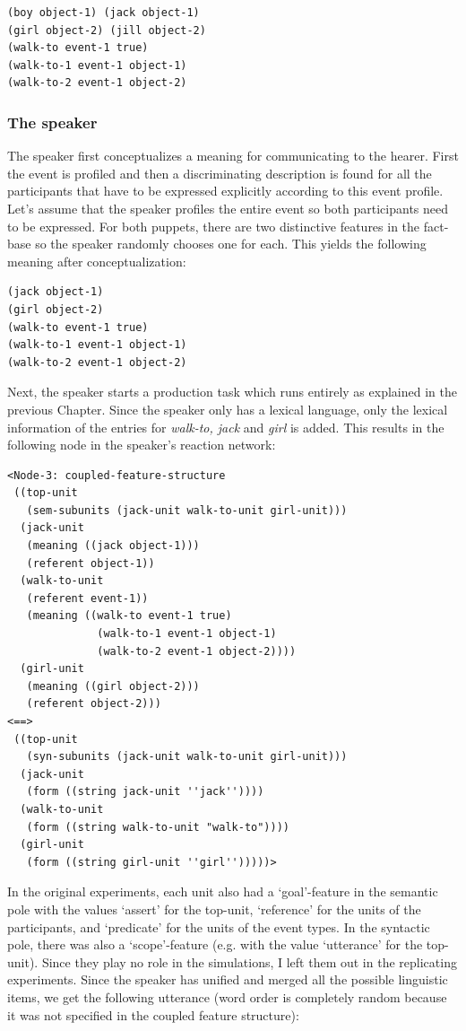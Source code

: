 \ea
\begin{lstlisting}
(boy object-1) (jack object-1)
(girl object-2) (jill object-2)
(walk-to event-1 true)
(walk-to-1 event-1 object-1)
(walk-to-2 event-1 object-2)
\end{lstlisting}
\z

\subsubsection{The speaker}
 The speaker first conceptualizes a meaning for communicating to the hearer. First the event is profiled and then a discriminating description is found for all the participants that have to be expressed explicitly according to this event profile. Let's assume that the speaker profiles the entire event so both participants need to be expressed. For both puppets, there are two distinctive features in the fact-base so the speaker randomly chooses one for each. This yields the following meaning after conceptualization:

\ea
\begin{lstlisting}
(jack object-1)
(girl object-2)
(walk-to event-1 true)
(walk-to-1 event-1 object-1)
(walk-to-2 event-1 object-2)
\end{lstlisting}
\z

Next, the speaker starts a production task which runs entirely as explained in the previous Chapter. Since the speaker only has a lexical language, only the lexical information of the entries for {\em walk-to, jack} and {\em girl} is added. This results in the following node in the speaker's reaction network:

\ea
\begin{lstlisting}
<Node-3: coupled-feature-structure
 ((top-unit
   (sem-subunits (jack-unit walk-to-unit girl-unit)))
  (jack-unit
   (meaning ((jack object-1)))
   (referent object-1))
  (walk-to-unit
   (referent event-1))
   (meaning ((walk-to event-1 true)
              (walk-to-1 event-1 object-1)
              (walk-to-2 event-1 object-2))))
  (girl-unit
   (meaning ((girl object-2)))
   (referent object-2)))
<==>
 ((top-unit
   (syn-subunits (jack-unit walk-to-unit girl-unit)))
  (jack-unit
   (form ((string jack-unit ''jack''))))
  (walk-to-unit
   (form ((string walk-to-unit "walk-to"))))
  (girl-unit
   (form ((string girl-unit ''girl'')))))>
\end{lstlisting}
\z

In the original experiments, each unit also had a `goal'-feature in the semantic pole with the values `assert' for the top-unit, `reference' for the units of the participants, and `predicate' for the units of the event types. In the syntactic pole, there was also a `scope'-feature (e.g. with the value `utterance' for the top-unit). Since they play no role in the simulations, I left them out in the replicating experiments. Since the speaker has unified and merged all the possible linguistic items, we get the following utterance (word order is completely random because it was not specified in the coupled feature structure):

